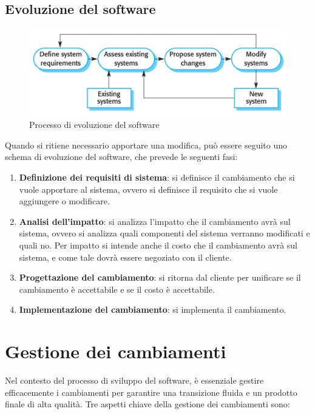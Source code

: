 \subsection{Evoluzione del software}
\begin{figure}[H]
    \centering
    \includegraphics[scale=0.7]{img/evolution.png}
    \caption{Processo di evoluzione del software}
\end{figure}
Quando si ritiene necessario apportare una modifica, può essere seguito uno schema
di evoluzione del software, che prevede le seguenti fasi:
\begin{enumerate}
    \item \textbf{Definizione dei requisiti di sistema}: si definisce il cambiamento che si vuole
    apportare al sistema, ovvero si definisce il requisito che si vuole aggiungere o
    modificare.
    \item \textbf{Analisi dell'impatto}: si analizza l'impatto che il cambiamento avrà
    sul sistema, ovvero si analizza quali componenti del sistema verranno modificati
    e quali no. Per impatto si intende anche il costo che il cambiamento avrà sul sistema,
    e come tale dovrà essere negoziato con il cliente.
    \item \textbf{Progettazione del cambiamento}: si ritorna dal cliente per unificare 
    se il cambiamento è accettabile e se il costo è accettabile. 
    \item \textbf{Implementazione del cambiamento}: si implementa il cambiamento.
\end{enumerate}

\section{Gestione dei cambiamenti}
Nel contesto del processo di sviluppo del software, è essenziale gestire efficacemente
i cambiamenti per garantire una transizione fluida e un prodotto finale di alta qualità.
Tre aspetti chiave della gestione dei cambiamenti sono:

